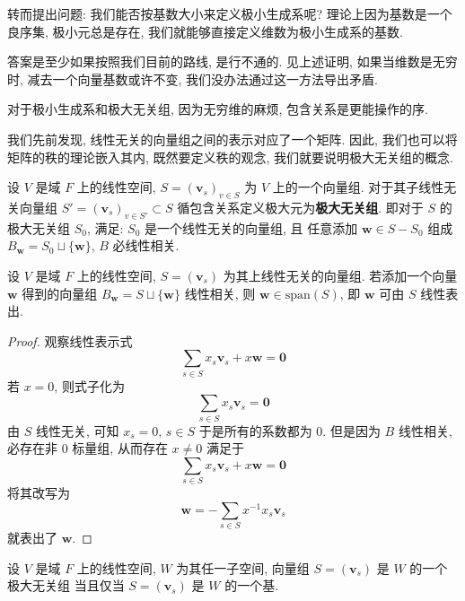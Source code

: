 \documentclass[UTF8]{book}
\begin{document}
\begin{remark}
    转而提出问题: 我们能否按基数大小来定义极小生成系呢? 
    理论上因为基数是一个良序集, 极小元总是存在, 
    我们就能够直接定义维数为极小生成系的基数. 

    答案是至少如果按照我们目前的路线, 是行不通的. 
    见上述证明, 如果当维数是无穷时, 减去一个向量基数或许不变, 
    我们没办法通过这一方法导出矛盾. 

    对于极小生成系和极大无关组, 因为无穷维的麻烦, 
    包含关系是更能操作的序. 
\end{remark}

我们先前发现, 线性无关的向量组之间的表示对应了一个矩阵. 
因此, 我们也可以将矩阵的秩的理论嵌入其内, 
既然要定义秩的观念, 我们就要说明极大无关组的概念. 

设 $V$ 是域 $F$ 上的线性空间, 
$S = (\boldsymbol{v}_s)_{v\in S}$ 为 $V$ 上的一个向量组. 
对于其子线性无关向量组 $S' = (\boldsymbol{v}_s)_{v\in S'} \subset S$ 
循包含关系定义极大元为\textbf{极大无关组}. 
即对于 $S$ 的极大无关组 $S_0$, 满足: 
$S_0$ 是一个线性无关的向量组, 且
任意添加 $\boldsymbol{w} \in S-S_0$ 组成 
$B_{\boldsymbol{w}}=S_0 \sqcup \{\boldsymbol{w}\}$, 
$B$ 必线性相关. 

\begin{lemma} \label{lemma add a vector}
    设 $V$ 是域 $F$ 上的线性空间, $S=(\boldsymbol{v}_s)$ 
    为其上线性无关的向量组. 若添加一个向量 $\boldsymbol{w}$ 
    得到的向量组 
    $B_{\boldsymbol{w}}=S \sqcup \{\boldsymbol{w}\}$ 
    线性相关, 则 $\boldsymbol{w} \in \mathrm{span}(S)$, 
    即 $\boldsymbol{w}$ 可由 $S$ 线性表出. 
\end{lemma}

\begin{proof}
    观察线性表示式 
    $$ \sum_{s \in S}x_s \boldsymbol{v}_s + x \boldsymbol{w} = 
    \boldsymbol{0} $$
    若 $x=0$, 则式子化为 
    $$ \sum_{s \in S}x_s \boldsymbol{v}_s  = 
    \boldsymbol{0} $$
    由 $S$ 线性无关, 可知 $x_s = 0,\,s\in S$ 
    于是所有的系数都为 0. 但是因为 $B$ 线性相关, 
    必存在非 0 标量组, 
    从而存在 $x \neq 0$ 满足于 
    $$ \sum_{s \in S}x_s \boldsymbol{v}_s + x \boldsymbol{w} = 
    \boldsymbol{0} $$ 
    将其改写为 
    $$\boldsymbol{w} = -\sum_{s \in S} x^{-1}x_s\boldsymbol{v}_s$$
    就表出了 $\boldsymbol{w}$. 
\end{proof}

\begin{theorem}
    设 $V$ 是域 $F$ 上的线性空间, $W$ 为其任一子空间, 
    向量组 $S=(\boldsymbol{v}_s)$ 是 $W$ 的一个极大无关组
    当且仅当 $S=(\boldsymbol{v}_s)$ 是 $W$ 的一个基. 
\end{theorem}
\end{document}
